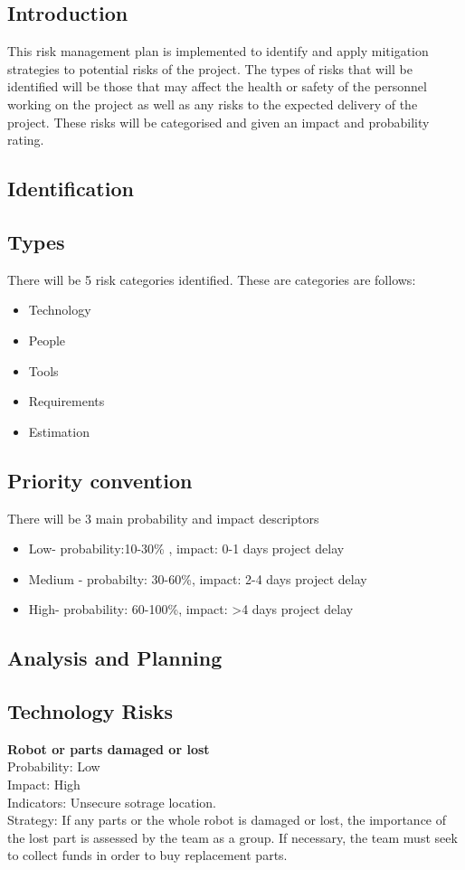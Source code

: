 		\subsection{Introduction}
		This risk management plan is implemented to identify and apply mitigation strategies to potential risks of the project. 
		The types of risks that will be identified will be those that may affect the health or safety of the personnel working on the project as well as 
		any risks to the expected delivery of the project. These risks will be categorised and given an impact and probability rating.
		\subsection{Identification}
			\subsection*{Types}
			There will be 5 risk categories identified. These are categories are follows: 
			\begin{itemize}
			\item Technology
			\item People
			\item Tools
			\item Requirements
			\item Estimation
			\end{itemize}	
			\subsection*{Priority convention}	
			There will be 3 main probability and impact  descriptors
			\begin{itemize}
			\item Low- probability:10-30\% , impact: 0-1 days project delay
			\item Medium - probabilty: 30-60\%, impact: 2-4 days project delay
			\item High- probability: 60-100\%, impact: >4 days project delay 
			\end{itemize}			
			
		\subsection{Analysis  and Planning}
			\subsection*{Technology Risks}
			\textbf{Robot or parts damaged or lost}\\
			Probability: Low\\
			Impact: High\\
			Indicators: Unsecure sotrage location.\\
			Strategy: If any parts or the whole robot is damaged or lost, the importance of the lost part is assessed by the team as a group. If necessary, the team must seek to collect funds in order to buy replacement parts.	\\
	
